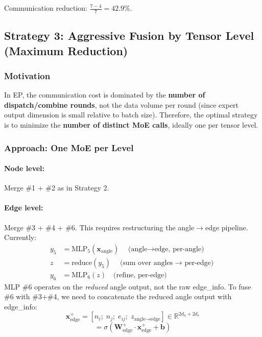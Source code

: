 \documentclass[11pt,a4paper]{article}
\newcommand{\R}{\mathbb{R}}
\newcommand{\act}{\sigma}
\newcommand{\W}{\mathbf{W}}
\newcommand{\bb}{\mathbf{b}}
\newcommand{\x}{\mathbf{x}}
\begin{document}
Communication reduction: $\frac{7-4}{7} = 42.9\%$.

\subsection{Strategy 3: Aggressive Fusion by Tensor Level (Maximum Reduction)}

\subsubsection{Motivation}

In EP, the communication cost is dominated by the \textbf{number of dispatch/combine rounds}, not the data volume per round (since expert output dimension is small relative to batch size). Therefore, the optimal strategy is to minimize the \textbf{number of distinct MoE calls}, ideally one per tensor level.

\subsubsection{Approach: One MoE per Level}

\paragraph{Node level:} Merge \#1 + \#2 as in Strategy 2.

\paragraph{Edge level:} Merge \#3 + \#4 + \#6. This requires restructuring the angle$\to$edge pipeline. Currently:
\begin{align}
    y_5 &= \text{MLP}_5(\x_{\text{angle}}) \quad \text{(angle$\to$edge, per-angle)} \\
    z &= \text{reduce}(y_5) \quad \text{(sum over angles $\to$ per-edge)} \\
    y_6 &= \text{MLP}_6(z) \quad \text{(refine, per-edge)}
\end{align}
MLP \#6 operates on the \textit{reduced} angle output, not the raw edge\_info. To fuse \#6 with \#3+\#4, we need to concatenate the reduced angle output with edge\_info:
\begin{equation}
    \x_{\text{edge}}^{+} = [n_i;\; n_j;\; e_{ij};\; z_{\text{angle}\to\text{edge}}] \in \R^{2d_n + 2d_e}
\end{equation}
\begin{equation}
    [\underbrace{y_{\text{node}}}_{\R^{Hd_n}};\; \underbrace{y_{\text{edge\_self}}}_{\R^{d_e}};\; \underbrace{y_{\text{edge\_angle}}}_{\R^{d_e}}] = \act\!\left(\W_{\text{edge}}^{+} \cdot \x_{\text{edge}}^{+} + \bb\right)
\end{equation}
\end{document}
